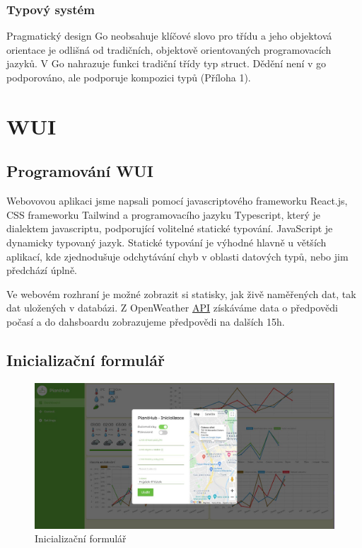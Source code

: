 \documentclass[czech,12pt,a4paper]{article}
\begin{document}
\subsubsection{Typový systém}

Pragmatický design Go neobsahuje klíčové slovo pro třídu a jeho objektová orientace je odlišná od tradičních, objektově orientovaných programovacích jazyků. V Go nahrazuje funkci tradiční třídy typ struct. Dědění není v go podporováno, ale podporuje kompozici typů (Příloha 1).

\clearpage

\section{WUI}

\subsection{Programování WUI}

Webovovou aplikaci jsme napsali pomocí javascriptového frameworku
React.js, CSS frameworku Tailwind a programovacího jazyku Typescript, který je dialektem javascriptu, podporující volitelné statické typování. JavaScript je dynamicky typovaný jazyk. Statické typování je výhodné hlavně u větších aplikací, kde zjednodušuje odchytávání chyb v oblasti datových typů, nebo jim předchází úplně.

Ve webovém rozhraní je možné zobrazit si statisky, jak živě naměřených dat, tak dat uložených v databázi. Z OpenWeather \underline{\ac{API}} získáváme data o předpovědi počasí a do dahsboardu zobrazujeme předpovědi na dalších 15h.

\subsection{Inicializační formulář}

\begin{figure}[h]
	\centering
	\includegraphics[width=\linewidth]{ui-inicializace.jpg}
	\caption{Inicializační formulář}
\end{figure}
\end{document}
